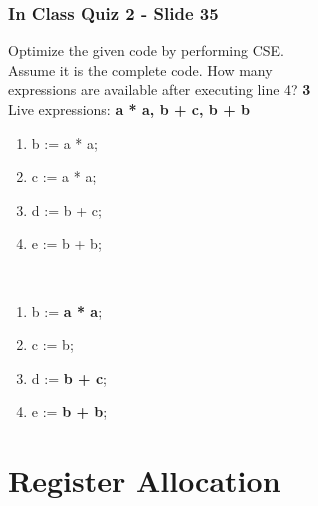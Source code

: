 \documentclass{report}
\begin{document}
\subsection{In Class Quiz 2 - Slide 35}
\vspace{-1em}
\begin{multicols}{2}
Optimize the given code by performing CSE. \\
Assume it is the complete code. How many \\
expressions are available after executing line 4? \textbf{3} \\
Live expressions: \textbf{a * a, b + c, b + b}
\vspace{-1em}
  \begin{multicols}{3}
    \begin{enumerate}
      \item b := a * a;
      \item c := a * a;
      \item d := b + c;
      \item e := b + b;
    \end{enumerate}
\vfill\columnbreak
 \ \\
\vfill\columnbreak
    \begin{enumerate}
      \item b := \textbf{a * a};
      \item c := b;
      \item d := \textbf{b + c};
      \item e := \textbf{b + b};
    \end{enumerate}
  \end{multicols}
\end{multicols}


\chapter{Register Allocation}
\end{document}
